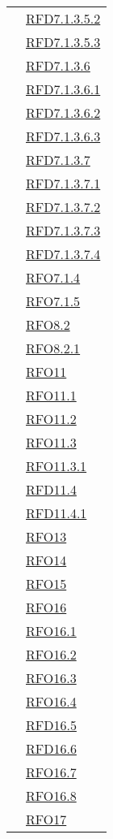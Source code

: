 \begin{longtable}{|>{\centering}m{5cm}|m{5cm}<{\centering}|}
& \hyperlink{RFD7.1.3.5.2}{RFD7.1.3.5.2}\\
& \hyperlink{RFD7.1.3.5.3}{RFD7.1.3.5.3}\\
& \hyperlink{RFD7.1.3.6}{RFD7.1.3.6}\\
& \hyperlink{RFD7.1.3.6.1}{RFD7.1.3.6.1}\\
& \hyperlink{RFD7.1.3.6.2}{RFD7.1.3.6.2}\\
& \hyperlink{RFD7.1.3.6.3}{RFD7.1.3.6.3}\\
& \hyperlink{RFD7.1.3.7}{RFD7.1.3.7}\\
& \hyperlink{RFD7.1.3.7.1}{RFD7.1.3.7.1}\\
& \hyperlink{RFD7.1.3.7.2}{RFD7.1.3.7.2}\\
& \hyperlink{RFD7.1.3.7.3}{RFD7.1.3.7.3}\\
& \hyperlink{RFD7.1.3.7.4}{RFD7.1.3.7.4}\\
& \hyperlink{RFO7.1.4}{RFO7.1.4}\\
& \hyperlink{RFO7.1.5}{RFO7.1.5}\\
& \hyperlink{RFO8.2}{RFO8.2}\\
& \hyperlink{RFO8.2.1}{RFO8.2.1}\\
& \hyperlink{RFO11}{RFO11}\\
& \hyperlink{RFO11.1}{RFO11.1}\\
& \hyperlink{RFO11.2}{RFO11.2}\\
& \hyperlink{RFO11.3}{RFO11.3}\\
& \hyperlink{RFO11.3.1}{RFO11.3.1}\\
& \hyperlink{RFD11.4}{RFD11.4}\\
& \hyperlink{RFD11.4.1}{RFD11.4.1}\\
& \hyperlink{RFO13}{RFO13}\\
& \hyperlink{RFO14}{RFO14}\\
& \hyperlink{RFO15}{RFO15}\\
& \hyperlink{RFO16}{RFO16}\\
& \hyperlink{RFO16.1}{RFO16.1}\\
& \hyperlink{RFO16.2}{RFO16.2}\\
& \hyperlink{RFO16.3}{RFO16.3}\\
& \hyperlink{RFO16.4}{RFO16.4}\\
& \hyperlink{RFD16.5}{RFD16.5}\\
& \hyperlink{RFD16.6}{RFD16.6}\\
& \hyperlink{RFO16.7}{RFO16.7}\\
& \hyperlink{RFO16.8}{RFO16.8}\\
& \hyperlink{RFO17}{RFO17}\\

\end{longtable}
